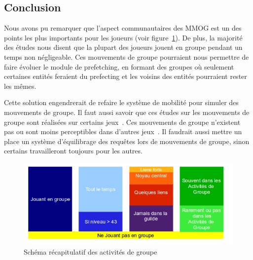 \subsection{Conclusion}
Nous avons pu remarquer que l'aspect communautaires des MMOG est un des points les plus importants pour les joueurs (voir figure~\ref{recapstat}). De plus, la majorité des études nous disent que la plupart des joueurs jouent en groupe pendant un temps non négligeable. Ces mouvements de groupe pourraient nous permettre de faire évoluer le module de prefetching, en formant des groupes où seulement certaines entités feraient du prefecting et les voisins des entités pourraient rester les mêmes.
\par Cette solution engendrerait de refaire le système de mobilité pour simuler des mouvements de groupe. Il faut aussi savoir que ces études sur les mouvements de groupe sont réalisées sur certains jeux~\cite{wow,everquest}. Ces mouvements de groupe n'existent pas ou sont moins perceptibles dans d'autres jeux~\cite{sl}. Il faudrait aussi mettre un place un système d'équilibrage des requêtes lors de mouvements de groupe, sinon certains travailleront toujours pour les autres.

	\vspace{5cm}
	\begin{figure}[!h]
        \centering
        \includegraphics[scale=0.65]{./Ressources/Images/recapstat.png}
        \caption{Schéma récapitulatif des activités de groupe}
        \label{recapstat}
        \end{figure}

